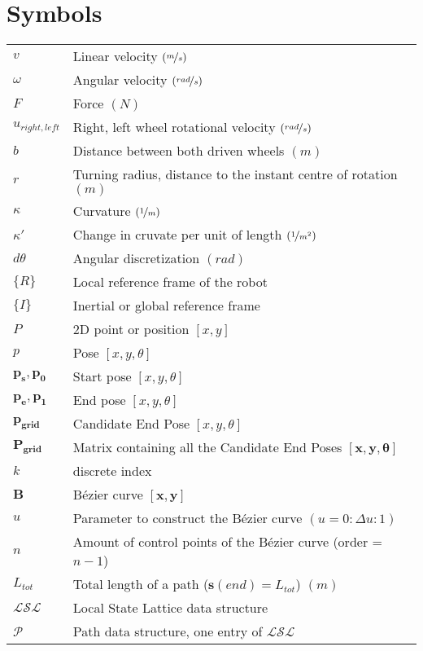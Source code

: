 \documentclass[oneside,english,master=wtk,inputenc="utf8"]{kulemt}
\newcommand{\nf}{\nicefrac}
\begin{document}
\section*{Symbols}
\begin{flushleft}
\renewcommand{\arraystretch}{1.1}
\begin{tabularx}{\textwidth}{@{}p{16mm}X@{}}
$v$					& Linear velocity $(\nf{m}{s})$ \\
$\omega$   	& Angular velocity $(\nf{rad}{s})$  \\
$F$					& Force $(N)$ \\
$u_{right,left}$ & Right, left wheel rotational velocity $(\nf{rad}{s})$ \\
$b$ 					& Distance between both driven wheels $(m)$ \\
$r$   				& Turning radius, distance to the instant centre of rotation $(m)$\\
$\kappa$  		& Curvature $(\nf{1}{m})$ \\
$\kappa'$		& Change in cruvate per unit of length $(\nf{1}{m^2})$ \\
$d\theta$		& Angular discretization $(rad)$ \\
$\{R\}$ 			& Local reference frame of the robot \\
$\{I\}$ 				& Inertial or global reference frame \\
$P$ 				& 2D point or position $[x, y]$ \\
${p}$				& Pose $[x,y,\theta]$ \\
$\bm{p_s},\bm{p_0}$ 	& Start pose $[x,y,\theta]$ \\
$\bm{p_e},\bm{p_1}$  	& End pose $[x,y,\theta]$ \\
$\bm{p_{grid}}$ & Candidate End Pose  $[x,y,\theta]$\\
$\bm{P_{grid}}$ & Matrix containing all the Candidate End Poses $[\bm{x},\bm{y},\bm{\theta}]$ \\
$k$					& discrete index \\
$\bm{B}$ 		& Bézier curve $[\bm{x}, \bm{y}]$\\
$u$					& Parameter to construct the Bézier curve $(u =0:\Delta u:1)$ \\
$n$					& Amount of control points of the Bézier curve (order = $n-1$) \\
$L_{tot}$		& Total length of a path ($\bm{s}(end)=L_{tot}$) $(m)$\\
$\mathcal{LSL}$ 	& Local State Lattice data structure\\
$\mathcal{P}$ 		& Path data structure, one entry of $\mathcal{LSL}$  \\

\end{tabularx}
\end{flushleft}
\end{document}
